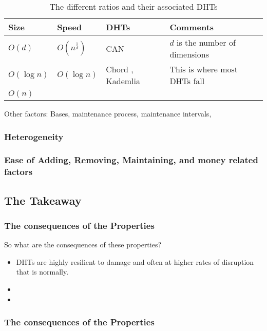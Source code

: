 \documentclass[10pt,letterpaper]{report}
\begin{document}
\begin{table}
    \centering
    \begin{tabular}{|l|l|l|l|}
    \hline
    Size & Speed & DHTs & Comments \\ \hline
    
    $O(d)$ & $O(n^{\frac{1}{d}})$ & CAN \cite{can} & $d$ is the number of dimensions \\ \hline
    
    $O(\log n)$ & $O(\log n)$ & Chord \cite{chord}, Kademlia \cite{kademlia} & This is where most DHTs fall \\ \hline
    
    $O(n)$ &  & & \\ \hline
    \end{tabular}
    \caption{The different ratios and their associated DHTs}
    \label{tab:tradeoffs}
\end{table}

Other factors: Bases, maintenance process, maintenance intervals,

\subsubsection{Heterogeneity}


\subsubsection{Ease of Adding, Removing, Maintaining, and money related factors}

\subsection{The Takeaway}


\subsubsection{The consequences of the Properties}
So what are the consequences of these properties?
\begin{itemize}
	\item DHTs are highly resilient to damage and often at higher rates of disruption that is normally.
	\item 
	\item 
\end{itemize}


\subsubsection{The consequences of the Properties}
\end{document}
